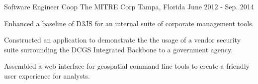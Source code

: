 \begin{cventries}
\cventry
  {Software Engineer Coop} %
  {The MITRE Corp} %
  {Tampa, Florida} %
  {June 2012 - Sep. 2014} %
  {
    \begin{cvitems} %
      \item {Enhanced a baseline of D3JS for an internal suite of corporate management tools.}
      \item {Constructed an application to demonstrate the the usage of a vendor security suite surrounding the DCGS Integrated Backbone to a government agency.}
      \item {Assembled a web interface for geospatial command line tools to create a friendly user experience for analysts.}
    \end{cvitems}
  }

\end{cventries}
